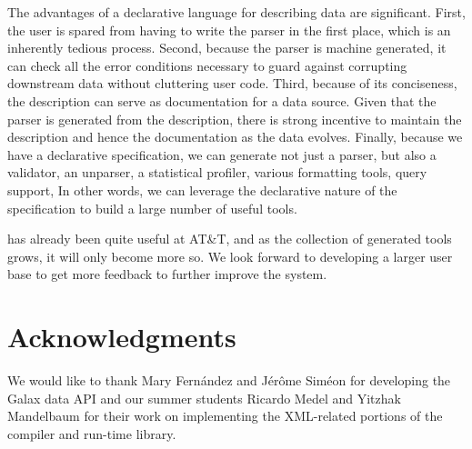\documentclass{sig-alternate}
\begin{document}
The 
advantages of a declarative language for describing data are
significant.  First, the user is spared from having to write
the parser in the first place, which is an inherently tedious
process.   Second, because the parser is machine
generated, it can check all the error conditions necessary to
guard against corrupting downstream data without cluttering
user code.  Third, because of its conciseness, the \pads{}
description can serve as documentation for a data source.  Given
that the parser is generated from the description, there is 
strong incentive to maintain the description and hence the documentation
as the data evolves.  Finally, because we have a declarative
specification, we can generate not just a parser, but also
a validator, an unparser, a statistical profiler, various formatting
tools, query support, \etc{}  In other words, we can leverage the declarative nature of the specification to build a large number of useful tools.

\pads{} has already been quite useful at AT\&T, and as the collection of generated tools grows, it will only become more so.  We look forward to developing a larger user base to get more feedback to further improve the system. 


\section{Acknowledgments}
We would like to thank Mary Fern\'andez and J\'er\^ome Sim\'eon for 
developing the Galax data API and our summer
students Ricardo Medel and Yitzhak Mandelbaum for their work on implementing
the XML-related portions of the \pads{} compiler and run-time library.


 
\end{document}
